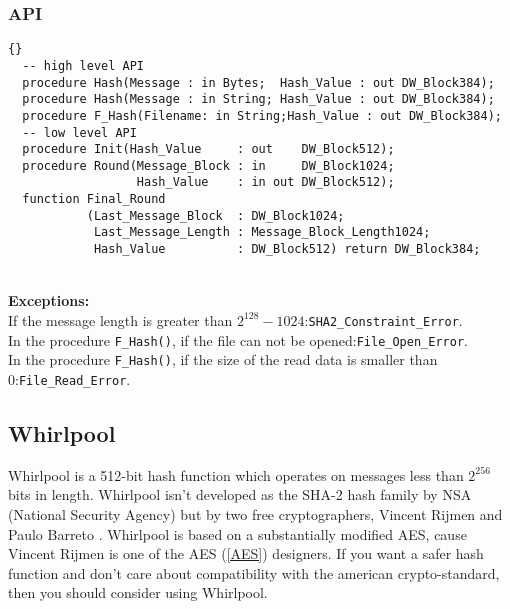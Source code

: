 \subsubsection*{API}
\begin{lstlisting}{}
  -- high level API
  procedure Hash(Message : in Bytes;  Hash_Value : out DW_Block384);
  procedure Hash(Message : in String; Hash_Value : out DW_Block384);
  procedure F_Hash(Filename: in String;Hash_Value : out DW_Block384);
  -- low level API
  procedure Init(Hash_Value     : out    DW_Block512);
  procedure Round(Message_Block : in     DW_Block1024;
                  Hash_Value    : in out DW_Block512);
  function Final_Round
           (Last_Message_Block  : DW_Block1024;
            Last_Message_Length : Message_Block_Length1024;
            Hash_Value          : DW_Block512) return DW_Block384;
\end{lstlisting}\\
\textbf{Exceptions:}\\
If the message length is greater than $2^{128}-1024$:\quad\texttt{SHA2\_Constraint\_Error}.\\
In the procedure \texttt{F\_Hash()}, if the file can not be opened:\quad\texttt{File\_Open\_Error}.\\
In the procedure \texttt{F\_Hash()}, if the size of the read data is smaller than 0:\quad\texttt{File\_Read\_Error}.\\
\subsection{Whirlpool}
Whirlpool is a 512-bit hash function which operates on messages less than $2^{256}$ bits in length. Whirlpool isn't developed as the SHA-2 hash family by NSA (National Security Agency) but by two free cryptographers, Vincent Rijmen and Paulo Barreto \cite{Whirlpool}. Whirlpool is based on a substantially modified AES, cause Vincent Rijmen is one of the AES (\ref{AES}) designers. If you want a safer hash function and don't care about compatibility with the american crypto-standard, then you should consider using Whirlpool.
